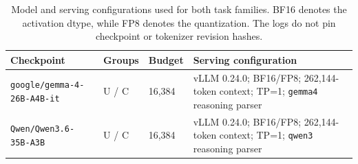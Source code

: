 \begin{table}[t]
\centering
\caption{Model and serving configurations used for both task families. BF16 denotes the activation dtype, while FP8 denotes the quantization. The logs do not pin checkpoint or tokenizer revision hashes.}
\label{tab:models}
\scriptsize
\begin{tabularx}{\textwidth}{p{}p{}p{}X}
\toprule
Checkpoint & Groups & Budget & Serving configuration \\
\midrule
\texttt{google/gemma-4-26B-A4B-it} & U / C & 16,384 & vLLM 0.24.0; BF16/FP8; 262,144-token context; TP=1; \texttt{gemma4} reasoning parser \\
\texttt{Qwen/Qwen3.6-35B-A3B} & U / C & 16,384 & vLLM 0.24.0; BF16/FP8; 262,144-token context; TP=1; \texttt{qwen3} reasoning parser \\
\bottomrule
\end{tabularx}
\end{table}
